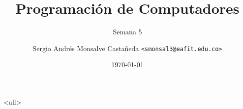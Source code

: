 \documentclass[12pt]{beamer}
\title[ST0240-063]{Programación de Computadores}
\subtitle{Semana 5}
\author[]{Sergio Andrés Monsalve Castañeda \texttt{<smonsal3@eafit.edu.co>}}
\institute[Universidad EAFIT]{Universidad EAFIT}
\date{\today}
\begin{document}
\begin{frame}
  \titlepage
\end{frame}

\mode*

\mode<all>


% 


   
\end{document}
